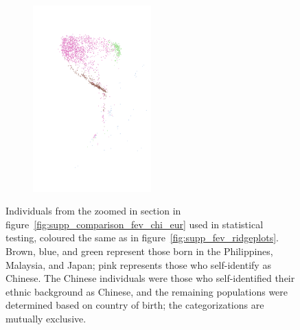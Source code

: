 \documentclass[12pt]{pnas-new}
\begin{document}
\begin{figure}
    \centering
    \begin{subfigure}{0.5\textwidth}
    \includegraphics[width=0.5\textwidth]{images/east_asia_population_colours.png}
    \end{subfigure}
    \caption{Individuals from the zoomed in section in figure~\ref{fig:supp_comparison_fev_chi_eur} used in statistical testing, coloured the same as in figure~\ref{fig:supp_fev_ridgeplots}. Brown, blue, and green represent those born in the Philippines, Malaysia, and Japan; pink represents those who self-identify as Chinese. The Chinese individuals were those who self-identified their ethnic background as Chinese, and the remaining populations were determined based on country of birth; the categorizations are mutually exclusive.}
    \label{fig:supp_fev_test_pops}
\end{figure}
\end{document}
